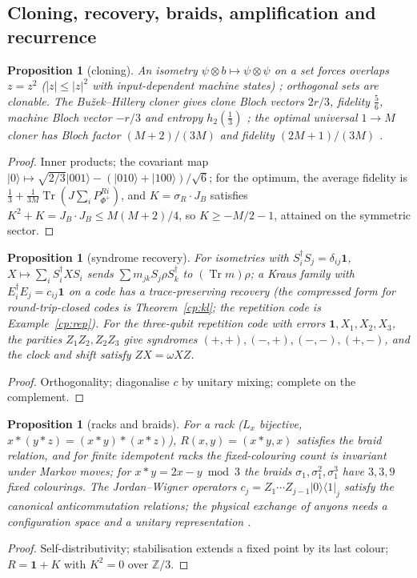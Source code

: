 \documentclass[aps,pra,onecolumn,superscriptaddress,nofootinbib,10pt]{revtex4-2}
\newtheorem{proposition}[theorem]{Proposition}
\theoremstyle{definition}
\theoremstyle{remark}
\newcommand{\Z}{\mathbb{Z}}
\newcommand{\tr}{\operatorname{Tr}}
\begin{document}
\subsection{Cloning, recovery, braids, amplification and recurrence}\label{sec:bdmisc}

\begin{proposition}[cloning]\label{prop:bdclone}
An isometry $\psi\otimes b\mapsto\psi\otimes\psi$ on a set forces overlaps $z=z^2$ ($\lvert z\rvert\le\lvert z\rvert^2$ with input-dependent machine states) \cite{n4:WZ,n4:Dieks};
orthogonal sets are clonable.  The Bu\v{z}ek--Hillery cloner gives clone Bloch vectors $2r/3$, fidelity $\tfrac56$, machine Bloch
vector $-r/3$ and entropy $h_2(\tfrac13)$ \cite{n4:BH}; the optimal universal $1\to M$ cloner has Bloch factor $(M+2)/(3M)$ and fidelity
$(2M+1)/(3M)$ \cite{n4:GM}.
\end{proposition}
\begin{proof}
Inner products; the covariant map $\lvert0\rangle\mapsto\sqrt{2/3}\lvert001\rangle-(\lvert010\rangle+\lvert100\rangle)/\sqrt6$; for the optimum, the average fidelity is
$\tfrac13+\tfrac1{3M}\tr(J\sum_iP^{Ri}_{\Phi^+})$, and $K=\sigma_R\cdot J_B$ satisfies $K^2+K=J_B\cdot J_B\le M(M+2)/4$, so $K\ge-M/2-1$, attained on the symmetric sector.
\end{proof}

\begin{proposition}[syndrome recovery]\label{prop:bdrecovery}
For isometries with $S_i^\dagger S_j=\delta_{ij}\mathbf1$, $X\mapsto\sum_iS_i^\dagger XS_i$ sends $\sum m_{jk}S_j\rho S_k^\dagger$ to $(\tr m)\rho$; a Kraus family with $E_i^\dagger E_j=c_{ij}\mathbf1$ on a code
has a trace-preserving recovery \cite{n4:KL} (the compressed form for round-trip-closed codes is Theorem~\ref{cp:kl}; the
repetition code is Example~\ref{cp:rep}).  For the three-qubit repetition code with errors $\mathbf1,X_1,X_2,X_3$, the parities
$Z_1Z_2,Z_2Z_3$ give syndromes $(+,+),(-,+),(-,-),(+,-)$, and the clock and shift satisfy $ZX=\omega XZ$.
\end{proposition}
\begin{proof}
Orthogonality; diagonalise $c$ by unitary mixing; complete on the complement.
\end{proof}

\begin{proposition}[racks and braids]\label{prop:bdbraid}
For a rack ($L_x$ bijective, $x*(y*z)=(x*y)*(x*z)$), $R(x,y)=(x*y,x)$ satisfies the braid relation, and for finite idempotent racks
the fixed-colouring count is invariant under Markov moves; for $x*y=2x-y\bmod3$ the braids $\sigma_1,\sigma_1^2,\sigma_1^3$ have $3,3,9$ fixed
colourings.  The Jordan--Wigner operators $c_j=Z_1\cdots Z_{j-1}\lvert0\rangle\langle1\rvert_j$ satisfy the canonical anticommutation relations; the
physical exchange of anyons needs a configuration space and a unitary representation \cite{n4:Nayak}.
\end{proposition}
\begin{proof}
Self-distributivity; stabilisation extends a fixed point by its last colour; $R=\mathbf1+K$ with $K^2=0$ over $\Z/3$.
\end{proof}
\end{document}
